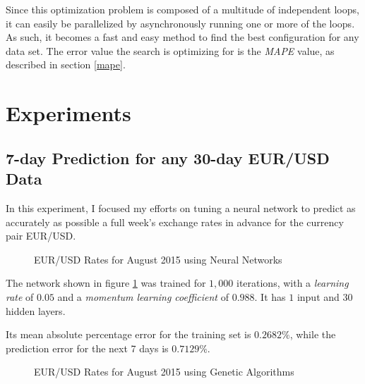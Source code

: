 \documentclass[a4paper,12pt]{article}
\begin{document}
	Since this optimization problem is composed of a multitude of independent loops, it can easily be parallelized by asynchronously running one or more of the loops. As such, it becomes a fast and easy method to find the best configuration for any data set. The error value the search is optimizing for is the \textit{MAPE} value, as described in section \ref{mape}.
	
\section{Experiments}
\subsection{7-day Prediction for any 30-day EUR/USD Data}
	
	In this experiment, I focused my efforts on tuning a neural network to predict as accurately as possible a full week's exchange rates in advance for the currency pair EUR/USD.
	
	\begin{figure}[!htbp]
		\centering
		\caption{EUR/USD Rates for August 2015 using Neural Networks}
		\label{eur_usd_august_30_neuron}
	\end{figure}
	
	The network shown in figure \ref{eur_usd_august_30_neuron} was trained for $1,000$ iterations, with a \textit{learning rate} of $0.05$ and a \textit{momentum learning coefficient} of $0.988$. It has $1$ input and $30$ hidden layers.
	
	Its mean absolute percentage error for the training set is $0.2682\%$, while the prediction error for the next 7 days is $0.7129\%$.
	
	\begin{figure}[!htbp]
		\centering
		\caption{EUR/USD Rates for August 2015 using Genetic Algorithms}
		\label{eur_usd_august_30_genetic}
	\end{figure}
	
\end{document}
